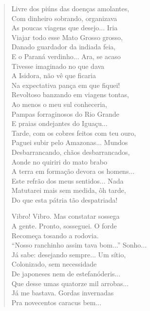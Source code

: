 \begin{verse}
Livre dos piúns das doenças amolantes,\\
Com dinheiro sobrando, organizava\\
As poucas viagens que desejo... Iria\\
Viajar todo esse Mato Grosso grosso,\\
Danado guardador da indiada feia,\\
E o Paraná verdinho... Ara, se acaso\\
Tivesse imaginado no que dava\\
A Isidora, não vê que ficaria\\
Na expectativa pança em que fiquei!\\
Revoltoso banzando em viagens tontas,\\
Ao menos o meu sul conheceria,\\
Pampas forraginosos do Rio Grande\\
E praias ondejantes do Iguaçu...\\
Tarde, com os cobres feitos com teu ouro,\\
Paguei subir pelo Amazonas... Mundos\\
Desbarrancando, chãos desbarrancados,\\
Aonde no quiriri do mato brabo\\
A terra em formação devora os homens...\\
Este refrão dos meus sentidos... Nada\\
Matutarei mais sem medida, ôh tarde,\\
Do que esta pátria tão despatriada!

Vibro! Vibro. Mas constatar sossega\\
A gente. Pronto, sosseguei. O forde\\
Recomeça tosando a rodovia.\\
``Nosso ranchinho assim tava bom...'' Sonho...\\
Já sabe: desejando sempre... Um sítio,\\
Colonizado, sem necessidade\\
De japoneses nem de estefanóderis...\\
Que desse umas quatorze mil arrobas...\\
Já me bastava. Gordas invernadas\\
Pra novecentos caracus bem...


\end{verse}
